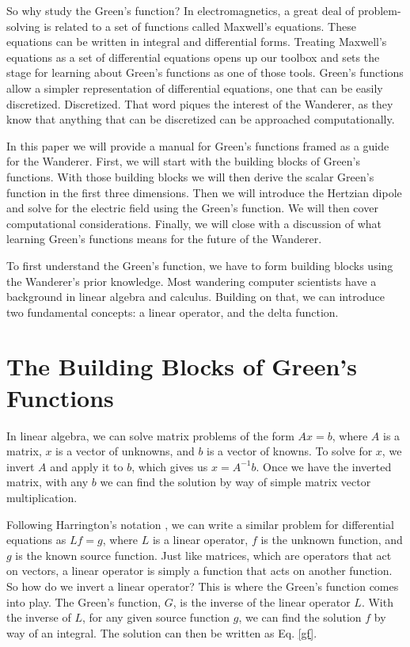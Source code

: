 \documentclass[lettersize,journal]{IEEEtran}
\begin{document}
So why study the Green's function? In electromagnetics, a great deal of problem-solving is related to a set of functions called Maxwell's equations. These equations can be written in integral and differential forms. Treating Maxwell's equations as a set of differential equations opens up our toolbox and sets the stage for learning about Green's functions as one of those tools. Green's functions allow a simpler representation of differential equations, one that can be easily discretized. Discretized. That word piques the interest of the Wanderer, as they know that anything that can be discretized can be approached computationally.

In this paper we will provide a manual for Green's functions framed as a guide for the Wanderer. First, we will start with the building blocks of Green's functions. With those building blocks we will then derive the scalar Green's function in the first three dimensions. Then we will introduce the Hertzian dipole and solve for the electric field using the Green's function. We will then cover computational considerations. Finally, we will close with a discussion of what learning Green's functions means for the future of the Wanderer.

To first understand the Green's function, we have to form building blocks using the Wanderer's prior knowledge. Most wandering computer scientists have a background in linear algebra and calculus. Building on that, we can introduce two fundamental concepts: a linear operator, and the delta function.

\section{The Building Blocks of Green's Functions}
In linear algebra, we can solve matrix problems of the form $Ax = b$, where $A$ is a matrix, $x$ is a vector of unknowns, and $b$ is a vector of knowns. To solve for $x$, we invert $A$ and apply it to $b$, which gives us $x = A^{-1}b$. Once we have the inverted matrix, with any $b$ we can find the solution by way of simple matrix vector multiplication.

Following Harrington's notation \cite{harrington}, we can write a similar problem for differential equations as $Lf = g$, where $L$ is a linear operator, $f$ is the unknown function, and $g$ is the known source function. Just like matrices, which are operators that act on vectors, a linear operator is simply a function that acts on another function. So how do we invert a linear operator? This is where the Green's function comes into play. The Green's function, $G$, is the inverse of the linear operator $L$. With the inverse of $L$, for any given source function $g$, we can find the solution $f$ by way of an integral. The solution can then be written as Eq. \eqref{gf}.
\end{document}
